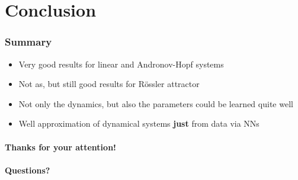 \section{Conclusion}

\begin{frame}
	\frametitle{Summary}
	\begin{itemize}
		\item Very good results for linear and Andronov-Hopf systems
		\item Not as, but still good results for R\"ossler attractor
		\item Not only the dynamics, but also the parameters could be learned quite well
		\item Well approximation of dynamical systems \textbf{just} from data via NNs
	\end{itemize}
\end{frame}

\begin{frame}
	\centering
	\paragraph{Thanks for your attention!}
\end{frame}

\begin{frame}
	\centering
	\paragraph{Questions?}
\end{frame}
